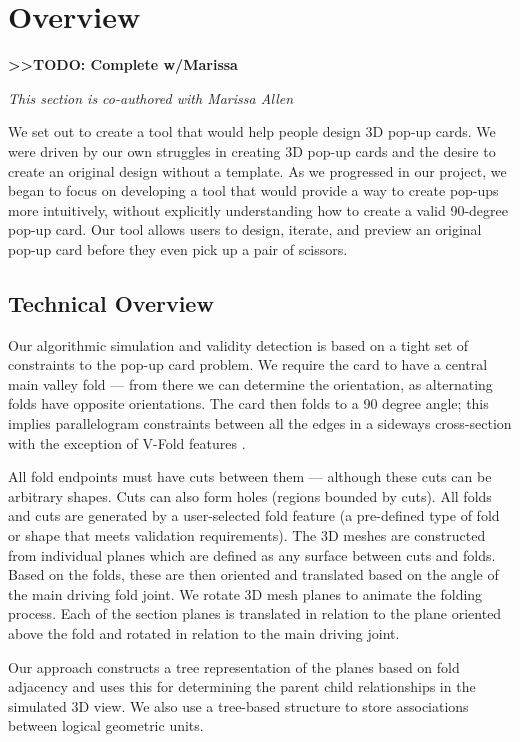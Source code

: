 \section{Overview}\label{overview}

\textbf{\textgreater{}\textgreater{}TODO: Complete w/Marissa}

\emph{This section is co-authored with Marissa Allen}

We set out to create a tool that would help people design 3D pop-up
cards. We were driven by our own struggles in creating 3D pop-up cards
and the desire to create an original design without a template. As we
progressed in our project, we began to focus on developing a tool that
would provide a way to create pop-ups more intuitively, without
explicitly understanding how to create a valid 90-degree pop-up card.
Our tool allows users to design, iterate, and preview an original pop-up
card before they even pick up a pair of scissors.

\subsection{Technical Overview}\label{technical-overview}

Our algorithmic simulation and validity detection is based on a tight
set of constraints to the pop-up card problem. We require the card to
have a central main valley fold --- from there we can determine the
orientation, as alternating folds have opposite orientations. The card
then folds to a 90 degree angle; this implies parallelogram constraints
between all the edges in a sideways cross-section with the exception of
V-Fold features .

All fold endpoints must have cuts between them --- although these cuts
can be arbitrary shapes. Cuts can also form holes (regions bounded by
cuts). All folds and cuts are generated by a user-selected fold feature
(a pre-defined type of fold or shape that meets validation
requirements). The 3D meshes are constructed from individual planes
which are defined as any surface between cuts and folds. Based on the
folds, these are then oriented and translated based on the angle of the
main driving fold joint. We rotate 3D mesh planes to animate the folding
process. Each of the section planes is translated in relation to the
plane oriented above the fold and rotated in relation to the main
driving joint.

Our approach constructs a tree representation of the planes based on
fold adjacency and uses this for determining the parent child
relationships in the simulated 3D view. We also use a tree-based
structure to store associations between logical geometric units.

